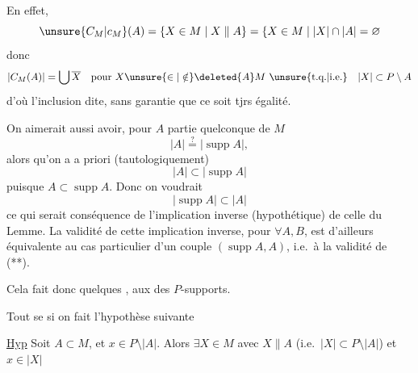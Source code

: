 
En effet,
\[
\unsure{C_M|c_M}(A)=\{X\in M\mid X\parallel A\}
=\{X\in M\mid |X|\cap|A|=\varnothing
\]
donc
\[
|C_M(A)|=\bigcup\overline X\quad\text{pour }X\unsure{\in|\notin}\deleted{A}M\ \unsure{\text{t.q.}|\text{i.e.}}\quad |X|\subset P\setminus A
\]
d'où l'inclusion dite, sans garantie que ce soit tjrs égalité.

On aimerait aussi avoir, pour $A$ partie quelconque de $M$
\[
|A|\overset{?}{=}|\operatorname{supp}A|,
\tag*{(**)}
\]
alors qu'on a a priori (tautologiquement)
\[
|A|\subset|\operatorname{supp}A|
\]
puisque $A\subset\operatorname{supp}A$.  Donc on voudrait
\[
|\operatorname{supp}A|\subset|A|
\]
ce qui serait conséquence de l'implication inverse (hypothétique) de celle du Lemme. La validité de cette implication inverse, pour $\forall A,B$, est d'ailleurs équivalente au cas particulier d'un couple $(\operatorname{supp}A,A)$, i.e.\ à la validité de (**).

Cela fait donc quelques ,  aux  des  $P$-supports.

Tout  se  si on fait l'hypothèse suivante

\uline{Hyp} Soit $A\subset M$, et $x\in P\setminus|A|$. Alors $\exists X\in M$ avec  $X\parallel A$ (i.e.\ $|X|\subset P\setminus|A|$) et $x\in|X|$
